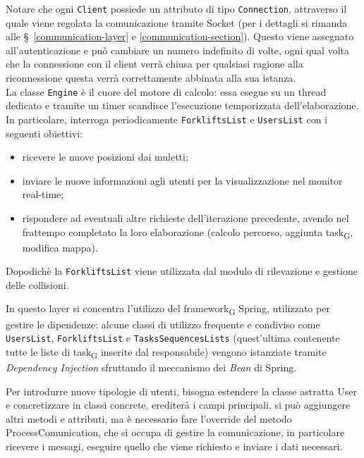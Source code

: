 Notare che ogni \texttt{Client} possiede un attributo di tipo \texttt{Connection}, attraverso il quale viene regolata la comunicazione tramite Socket (per i dettagli si rimanda alle \S\ \ref{communication-layer} e \ref{communication-section}). Questo viene assegnato all'autenticazione e può cambiare un numero indefinito di volte, ogni qual volta che la connessione con il client verrà chiusa per qualsiasi ragione alla riconnessione questa verrà correttamente abbinata alla sua istanza.\\

La classe \texttt{Engine} è il cuore del motore di calcolo: essa esegue su un thread dedicato e tramite un timer scandisce l'esecuzione temporizzata dell'elaborazione. In particolare, interroga periodicamente \texttt{ForkliftsList} e \texttt{UsersList} con i seguenti obiettivi:
\begin{itemize}
	\item ricevere le nuove posizioni dai muletti;
	\item inviare le nuove informazioni agli utenti per la visualizzazione nel monitor real-time;
	\item rispondere ad eventuali altre richieste dell'iterazione precedente, avendo nel frattempo completato la loro elaborazione (calcolo percorso, aggiunta task\textsubscript{G}, modifica mappa).
\end{itemize}
Dopodichè la \texttt{ForkliftsList} viene utilizzata dal modulo di rilevazione e gestione delle collisioni.

In questo layer si concentra l'utilizzo del framework\textsubscript{G} Spring, utilizzato per gestire le dipendenze: alcune classi di utilizzo frequente e condiviso come \texttt{UsersList}, \texttt{ForkliftsList} e \texttt{TasksSequencesLists} (quest'ultima contenente tutte le liste di task\textsubscript{G} inserite dal responsabile) vengono istanziate tramite \textit{Dependency Injection} sfruttando il meccanismo dei \textit{Bean} di Spring.

        Per introdurre nuove tipologie di utenti, bisogna estendere la classe astratta User e concretizzare in classi concrete, erediterà i campi principali, si può aggiungere altri metodi e attributi, ma è necessario fare l'override del metodo ProcessComunication, che si occupa di gestire la comunicazione, in particolare ricevere i messagi, eseguire quello che viene richiesto e inviare i dati necessari.


\clearpage
{}

